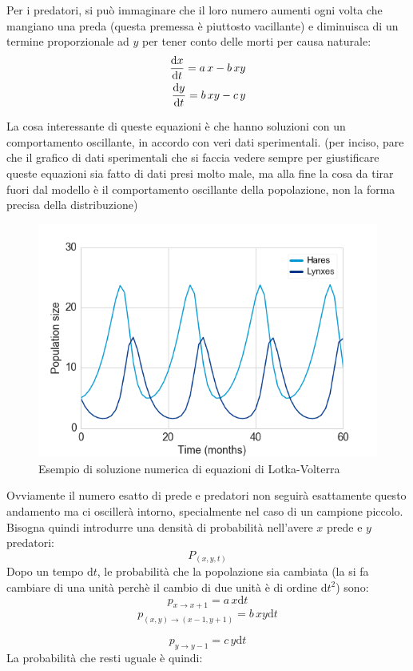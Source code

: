 \documentclass[a4paper,12pt]{article}
\renewcommand{\arg}[1]{_{(#1)}}
\theoremstyle{plain}
\theoremstyle{definition}
\renewcommand{\d}{\text{d}}
\theoremstyle{remark}
\begin{document}
	Per i predatori, si può immaginare che il loro numero aumenti ogni volta che mangiano una preda (questa premessa è piuttosto vacillante) e diminuisca di un termine proporzionale ad $y$ per tener conto delle morti per causa naturale:
	\begin{align}
\dv{x}{t}=a\,x-b\,x y\\
\dv{y}{t}=b\,x y-c\,y
\label{eq7}
	\end{align}

	La cosa interessante di queste equazioni è che hanno soluzioni con un comportamento oscillante, in accordo con veri dati sperimentali. (per inciso, pare che il grafico di dati sperimentali che si faccia vedere sempre per giustificare queste equazioni sia fatto di dati presi molto male, ma alla fine la cosa da tirar fuori dal modello è il comportamento oscillante della popolazione, non la forma precisa della distribuzione)
	\begin{figure}[h]
		\includegraphics[scale=0.6]{lotka}
		\caption{Esempio di soluzione numerica di equazioni di Lotka-Volterra}
	\end{figure}
	
	Ovviamente il numero esatto di prede e predatori non seguirà esattamente questo andamento ma ci oscillerà intorno, specialmente nel caso di un campione piccolo.
	Bisogna quindi introdurre una densità di probabilità nell'avere $x$ prede e $y$ predatori:
	\[P\arg{x,y,t}\]
	Dopo un tempo $\d t$, le probabilità che la popolazione sia cambiata (la si fa cambiare di una unità perchè il cambio di due unità è di ordine $\d t^2$) sono:
	\[p_{x\rightarrow x+1}=a\,x \d t	\]
	\[p_{(x,y)\rightarrow (x-1,y+1)}=b\,xy\d t\]
	
	\[p_{y\rightarrow y-1}=c\,y\d t\]
La probabilità che resti uguale è quindi:
\end{document}
